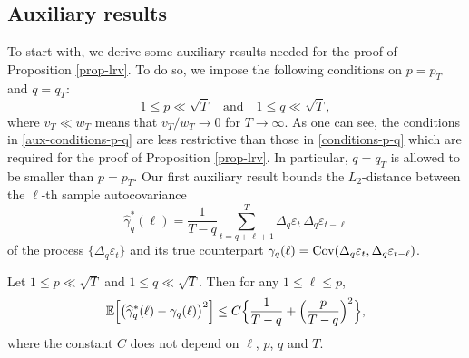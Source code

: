 \subsection*{Auxiliary results}


To start with, we derive some auxiliary results needed for the proof of Proposition \ref{prop-lrv}. To do so, we impose the following conditions on $p=p_T$ and $q=q_T$:
\begin{equation}\label{aux-conditions-p-q}
1 \le p \ll \sqrt{T} \quad \text{and} \quad 1 \le q \ll \sqrt{T},
\end{equation}
where $v_T \ll w_T$ means that $v_T/w_T \rightarrow 0$ for $T \rightarrow \infty$. As one can see, the conditions in \eqref{aux-conditions-p-q} are less restrictive than those in \eqref{conditions-p-q} which are required for the proof of Proposition \ref{prop-lrv}. In particular, $q=q_T$ is allowed to be smaller than $p=p_T$. Our first auxiliary result bounds the $L_2$-distance between the $\ell$-th sample autocovariance
\[ \widehat{\gamma}_q^*(\ell) =  \frac{1}{T-q} \sum\limits_{t=q+\ell+1}^T \Delta_q \varepsilon_t \, \Delta_q \varepsilon_{t-\ell} \]
of the process $\{\Delta_q \varepsilon_t \}$ and its true counterpart $\gamma_q(\ell) = \textnormal{Cov}(\Delta_q \varepsilon_t,\Delta_q \varepsilon_{t-\ell})$. 
\begin{lemmaA}\label{lemma-lrv-1}
Let $1 \le p \ll \sqrt{T}$ and $1 \le q \ll \sqrt{T}$. Then for any $1 \le \ell \le p$,   
\[ \mathbb{E} \Big[ \big( \widehat{\gamma}_q^*(\ell) - \gamma_q(\ell) \big)^2 \Big] \le C \Big\{ \frac{1}{T-q} + \Big(\frac{p}{T-q}\Big)^2 \Big\}, \]
where the constant $C$ does not depend on $\ell$, $p$, $q$ and $T$. 
\end{lemmaA}


